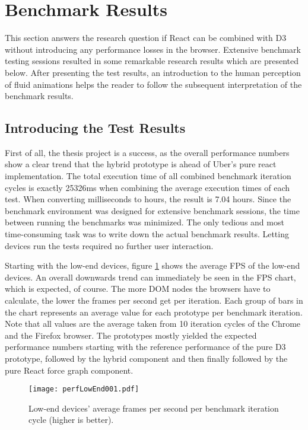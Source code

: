 \section{Benchmark Results}

This section answers the research question if React can be combined with D3 without introducing any performance losses in the browser. Extensive benchmark testing sessions resulted in some remarkable research results which are presented below. After presenting the test results, an introduction to the human perception of fluid animations helps the reader to follow the subsequent interpretation of the benchmark results.

\subsection{Introducing the Test Results}

First of all, the thesis project is a success, as the overall performance numbers show a clear trend that the hybrid prototype is ahead of Uber's pure react implementation. The total execution time of all combined benchmark iteration cycles is exactly 25326ms when combining the average execution times of each test. When converting milliseconds to hours, the result is 7.04 hours. Since the benchmark environment was designed for extensive benchmark sessions, the time between running the benchmarks was minimized. The only tedious and most time-consuming task was to write down the actual benchmark results. Letting devices run the tests required no further user interaction. 

Starting with the low-end devices, figure \ref{fig:perfLowEnd001} shows the average FPS of the low-end devices. An overall downwards trend can immediately be seen in the FPS chart, which is expected, of course. The more DOM nodes the browsers have to calculate, the lower the frames per second get per iteration. Each group of bars in the chart represents an average value for each prototype per benchmark iteration. Note that all values are the average taken from 10 iteration cycles of the Chrome and the Firefox browser. The prototypes mostly yielded the expected performance numbers starting with the reference performance of the pure D3 prototype, followed by the hybrid component and then finally followed by the pure React force graph component.

\begin{figure}
\centering
\texttt{[image: perfLowEnd001.pdf]}
\caption{Low-end devices' average frames per second per benchmark iteration cycle (higher is better).}
\label{fig:perfLowEnd001}
\end{figure}


